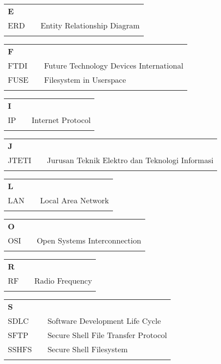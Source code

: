 \documentclass{jtetiskripsi}
\begin{document}
\begin{tabular}{p{20pt}p{3pt}l}
\textbf{E}\\
ERD & & Entity Relationship Diagram\\
\\
\end{tabular}

\begin{tabular}{p{20pt}p{3pt}l}
\textbf{F}\\
FTDI & & Future Technology Devices International\\
FUSE & & Filesystem in Userspace\\
\\
\end{tabular}

\begin{tabular}{p{20pt}p{3pt}l}
\textbf{I}\\
IP & & Internet Protocol\\
\\
\end{tabular}

\begin{tabular}{p{20pt}p{3pt}l}
\textbf{J}\\
JTETI & & Jurusan Teknik Elektro dan Teknologi Informasi\\
\\
\end{tabular}

\begin{tabular}{p{20pt}p{3pt}l}
\textbf{L}\\
LAN & & Local Area Network\\
\\
\end{tabular}

\begin{tabular}{p{20pt}p{3pt}l}
\textbf{O}\\
OSI & & Open Systems Interconnection\\
\\
\end{tabular}

\begin{tabular}{p{20pt}p{3pt}l}
\textbf{R}\\
RF & & Radio Frequency\\
\\
\end{tabular}

\begin{tabular}{p{20pt}p{3pt}l}
\textbf{S}\\
SDLC & & Software Development Life Cycle\\
SFTP & & Secure Shell File Transfer Protocol\\
SSHFS & & Secure Shell Filesystem\\
\\
\end{tabular}
\end{document}
